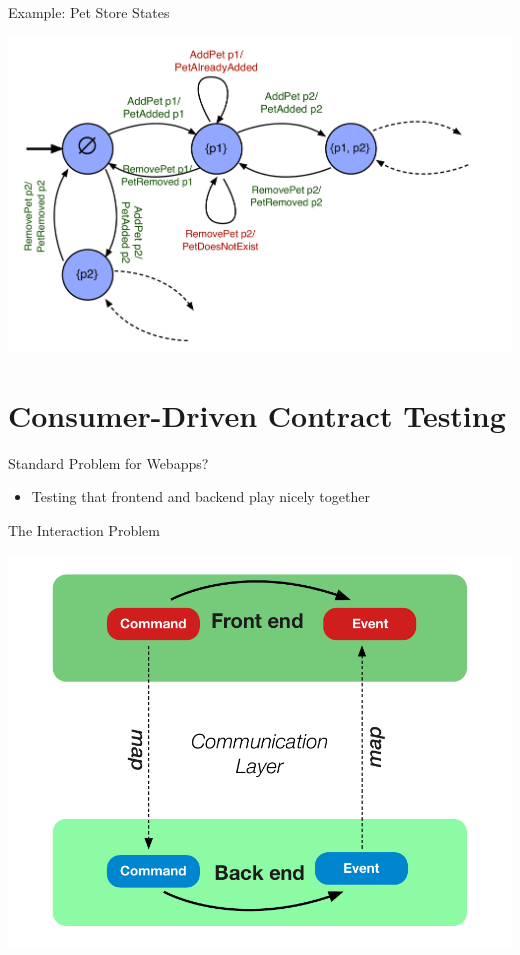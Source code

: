 \begin{frame}[fragile]{Example: Pet Store States}
\begin{center}
\includegraphics[height=.8\textheight]{./images/pet-store-iosm.pdf}
\end{center}
\end{frame}


\part{Consumer-Driven Contract Testing}



\begin{frame}[fragile]{Standard Problem for Webapps?}

\begin{itemize}
\item Testing that frontend and backend play nicely together
\end{itemize}

\end{frame}


\begin{frame}[fragile]{The Interaction Problem}
  \begin{center}
    \includegraphics[height=.8\textheight]{./images/interaction-loop.pdf}
  \end{center}
\end{frame}


